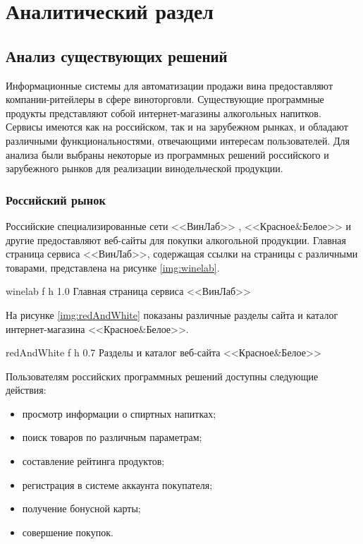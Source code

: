 \chapter{Аналитический раздел}

\section{Анализ существующих решений}

Информационные системы для автоматизации продажи вина предоставляют компании-ритейлеры в сфере виноторговли. Существующие программные продукты представляют собой интернет-магазины алкогольных напитков. Сервисы имеются как на российском, так и на зарубежном рынках, и обладают различными функциональностями, отвечающими интересам пользователей. Для анализа были выбраны некоторые из программных решений российского и зарубежного рынков для реализации винодельческой продукции.

\subsection{Российский рынок}

Российские специализированные сети <<ВинЛаб>> \cite{winelab}, <<Красное\&Белое>> \cite{kb} и другие предоставляют веб-сайты для покупки алкогольной продукции. Главная страница сервиса <<ВинЛаб>>, содержащая ссылки на страницы с различными товарами, представлена на рисунке \ref{img:winelab}.

    {winelab}
    {f}
    {h}
    {1.0\textwidth}
    {Главная страница сервиса <<ВинЛаб>>}

На рисунке \ref{img:redAndWhite} показаны различные разделы сайта и каталог интернет-магазина <<Красное\&Белое>>.

    {redAndWhite}
    {f}
    {h}
    {0.7\textwidth}
    {Разделы и каталог веб-сайта <<Красное\&Белое>>}
    
Пользователям российских программных решений доступны следующие действия:
\begin{itemize}
	\item просмотр информации о спиртных напитках;
	\item поиск товаров по различным параметрам;
	\item составление рейтинга продуктов;
	\item регистрация в системе аккаунта покупателя;
	\item получение бонусной карты;
	\item совершение покупок.
\end{itemize}

